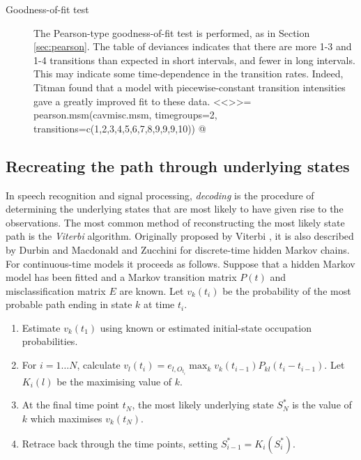\begin{description}
\item[Goodness-of-fit test] The Pearson-type goodness-of-fit test is
  performed, as in Section \ref{sec:pearson}.  The table of deviances
  indicates that there are more 1-3 and 1-4 transitions than expected
  in short intervals, and fewer in long intervals.  This may indicate
  some time-dependence in the transition rates. Indeed, Titman
  \cite{titman:phd} found that a model with piecewise-constant
  transition intensities gave a greatly improved fit to these data.
<<>>=
pearson.msm(cavmisc.msm, timegroups=2,
            transitions=c(1,2,3,4,5,6,7,8,9,9,9,10))
@


\end{description}


\subsection{Recreating the path through underlying states}

In speech recognition and signal processing, {\em decoding} is the
procedure of determining the underlying states that are most likely to
have given rise to the observations. The most common method of
reconstructing the most likely state path is the {\em Viterbi}
algorithm. Originally proposed by Viterbi \cite{viterbi}, it is also
described by Durbin \etal \cite{biolog:seq} and Macdonald and
Zucchini \cite{macdonald:zucchini} for discrete-time hidden Markov
chains.  For continuous-time models it proceeds as follows. Suppose
that a hidden Markov model has been fitted and a Markov transition
matrix $P(t)$ and misclassification matrix $E$ are known.  Let
$v_k(t_i)$ be the probability of the most probable path ending in state
$k$ at time $t_i$.
\begin{enumerate}
\item Estimate $v_k(t_1)$ using known or estimated initial-state
  occupation probabilities.
\item For $i = 1 \ldots N$, calculate $v_l(t_i) = e_{l,O_{t_i}} \max_k
  v_k(t_{i-1}) P_{kl}(t_{i} - t_{i-1})$. Let $K_i(l)$ be the
  maximising value of $k$.
\item At the final time point $t_N$, the most likely underlying
  state $S^*_N$ is the value of $k$ which maximises $v_k(t_N)$.
\item Retrace back through the time points, setting $S^*_{i-1} =
  K_i(S^*_i)$.
\end{enumerate}

